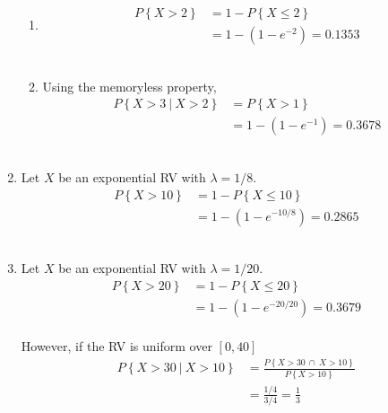 \begin{enumerate}
		\begin{enumerate}
			\item \begin{align}
				P \left\{X > 2\right\} &= 1 - P \left\{X \leq 2\right\} \nonumber \\
				&= 1 - (1 - e^{-2}) = 0.1353
			\end{align}\\
			
			\item Using the memoryless property,
			\begin{align}
				P \left\{X > 3\ |\ X > 2\right\} &= P \left\{X > 1 \right\} \nonumber \\
				&= 1 - (1 - e^{-1}) = 0.3678
			\end{align}\\
			
		\end{enumerate}
	
	
	\item Let $ X $ be an exponential RV with $ \lambda = 1/8 $.\\
			
		\begin{align}
			P \left\{X > 10\right\} &= 1 - P \left\{X \leq 10 \right\} \nonumber \\
			&= 1 - (1 - e^{-10/8}) = 0.2865
		\end{align}\\
	
	
	\item Let $ X $ be an exponential RV with $ \lambda = 1/20 $.\\
			
		\begin{align}
			P \left\{X > 20\right\} &= 1 - P \left\{X \leq 20 \right\} \nonumber \\
			&= 1 - (1 - e^{-20/20}) = 0.3679
		\end{align}\\
		
		However, if the RV is uniform over $ [0, 40] $\\
		
		\begin{align}
			P \left\{X > 30\ |\ X > 10\right\} &= \frac{P \left\{X > 30 \ \cap\  X > 10\right\}}{P \left\{X > 10\right\}} \nonumber \\
			&= \frac{1/4}{3/4} = \frac{1}{3}
		\end{align}\\
	

\end{enumerate}

